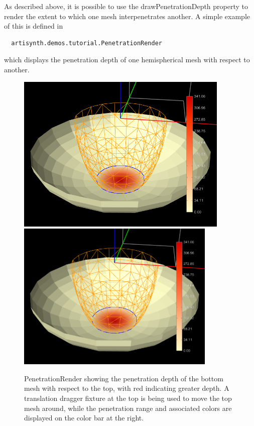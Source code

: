 As described above, it is possible to use the {\sf
drawPenetrationDepth} property to render the extent to which one mesh
interpenetrates another. A simple example
of this is defined in
%
\begin{verbatim}
  artisynth.demos.tutorial.PenetrationRender
\end{verbatim}
%
which displays the penetration depth of one hemispherical mesh with
respect to another.

\begin{figure}[ht]
\begin{center}
\iflatexml
 \includegraphics[]{images/PenetrationRender}
\else
 \includegraphics[width=3.75in]{images/PenetrationRender}
\fi
\end{center}
\caption{PenetrationRender showing the penetration depth of the bottom
mesh with respect to the top, with red indicating greater depth.
A translation dragger fixture at the top is being used to 
move the top mesh around, while the penetration range and
associated colors are displayed on the color bar at the right.}
\label{PenetrationRender:fig}
\end{figure}

